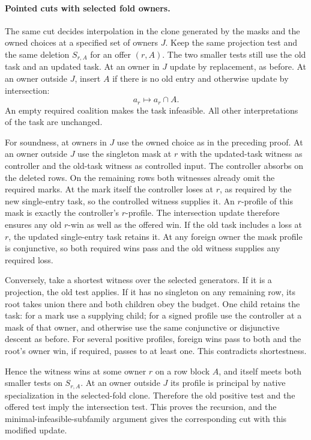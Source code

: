 \paragraph{Pointed cuts with selected fold owners.}
The same cut decides interpolation in the clone generated
by the masks and the owned choices at a specified set of
owners $J$. Keep the same projection test and the same
deletion $S_{r,A}$ for an offer $(r,A)$. The two smaller
tests still use the old task and an updated task. At an
owner in $J$ update by replacement, as before. At an owner
outside $J$, insert $A$ if there is no old entry and
otherwise update by intersection:
\[
                  a_r\longmapsto a_r\cap A .
\]
An empty required coalition makes the task infeasible.
All other interpretations of the task are unchanged.

For soundness, at owners in $J$ use the owned choice
as in the preceding proof. At an owner outside $J$ use
the singleton mask at $r$ with the updated-task witness
as controller and the old-task witness as controlled
input. The controller absorbs on the deleted rows.
On the remaining rows both witnesses already omit the
required marks. At the mark itself the controller loses
at $r$, as required by the new single-entry task, so
the controlled witness supplies it. An $r$-profile of
this mask is exactly the controller's $r$-profile. The
intersection update therefore ensures any old $r$-win
as well as the offered win. If the old task includes a
loss at $r$, the updated single-entry task retains it.
At any foreign owner the mask profile is conjunctive,
so both required wins pass and the old witness supplies
any required loss.

Conversely, take a shortest witness over the selected
generators. If it is a projection, the old test applies.
If it has no singleton on any remaining row, its root
takes union there and both children obey the budget.
One child retains the task: for a mark use a supplying
child; for a signed profile use the controller at a
mask of that owner, and otherwise use the same
conjunctive or disjunctive descent as before. For several
positive profiles, foreign wins pass to both and the
root's owner win, if required, passes to at least one.
This contradicts shortestness.

Hence the witness wins at some owner $r$ on a row block
$A$, and itself meets both smaller tests on $S_{r,A}$.
At an owner outside $J$ its profile is principal by
native specialization in the selected-fold clone.
Therefore the old positive test and the offered test
imply the intersection test. This proves the recursion,
and the minimal-infeasible-subfamily argument gives the
corresponding cut with this modified update.

